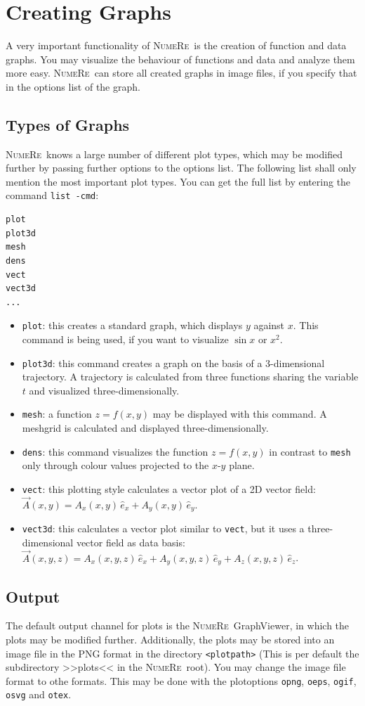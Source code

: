 \documentclass[DIV=14,headsepline,footsepline]{scrbook}
\newcommand{\NR}{\textsc{Nu\-me\-Re}}
\begin{document}
		\chapter{Creating Graphs}
			A very important functionality of \NR\ is the creation of function and data graphs. You may visualize the behaviour of functions and data and analyze them more easy. \NR\ can store all created graphs in image files, if you specify that in the options list of the graph.
			\section{Types of Graphs}
				\NR\ knows a large number of different plot types, which may be modified further by passing further options to the options list. The following list shall only mention the most important plot types. You can get the full list by entering the command \lstinline+list -cmd+:
				\begin{lstlisting}
plot
plot3d
mesh
dens
vect
vect3d
...
				\end{lstlisting}
				\begin{itemize}
					\item \lstinline+plot+: this creates a standard graph, which displays $y$ against $x$. This command is being used, if you want to visualize $\sin x$ or $x^2$.
					\item \lstinline+plot3d+: this command creates a graph on the basis of a 3-dimensional trajectory. A trajectory is calculated from three functions sharing the variable $t$ and visualized three-di\-men\-sion\-al\-ly.
					\item \lstinline+mesh+: a function $z = f(x,y)$ may be displayed with this command. A meshgrid is calculated and displayed three-dimensionally.
					\item \lstinline+dens+: this command visualizes the function $z = f(x,y)$ in contrast to \lstinline+mesh+ only through colour values projected to the $x$-$y$ plane.
					\item \lstinline+vect+: this plotting style calculates a vector plot of a 2D vector field: $\vec A(x,y) = A_x(x,y)\,\hat e_x + A_y(x,y)\,\hat e_y$.
					\item \lstinline+vect3d+: this calculates a vector plot similar to \lstinline+vect+, but it uses a three-dimensional vector field as data basis: $\vec A(x,y,z) = A_x(x,y,z)\,\hat e_x + A_y(x,y,z)\,\hat e_y + A_z(x,y,z)\,\hat e_z$.
				\end{itemize}
			\section{Output}
				The default output channel for plots is the \NR\ GraphViewer, in which the plots may be modified further. Additionally, the plots may be stored into an image file in the PNG format in the directory \lstinline+<plotpath>+ (This is per default the subdirectory >>plots<< in the \NR\ root). You may change the image file format to othe formats. This may be done with the plotoptions \lstinline+opng+, \lstinline+oeps+, \lstinline+ogif+, \lstinline+osvg+ and \lstinline+otex+.
				
\end{document}
